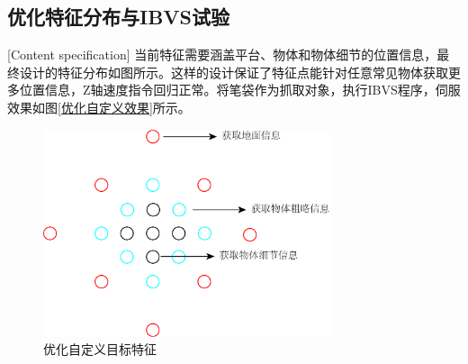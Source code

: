 \documentclass[fontset=fandol,type=bachelor,campus=harbin]{hithesisbook}
\begin{document}
\subsection{优化特征分布与IBVS试验}[Content specification]
当前特征需要涵盖平台、物体和物体细节的位置信息，最终设计的特征分布如图\label{优化自定义目标特征}所示。这样的设计保证了特征点能针对任意常见物体获取更多位置信息，Z轴速度指令回归正常。将笔袋作为抓取对象，执行IBVS程序，伺服效果如图\ref{优化自定义效果}所示。
\begin{figure}[h]
	\centering
	\includegraphics[width=0.75\textwidth]{chapter4/优化自定义目标特征}
	\caption{优化自定义目标特征}
	\label{优化自定义目标特征}
\end{figure}
\end{document}
